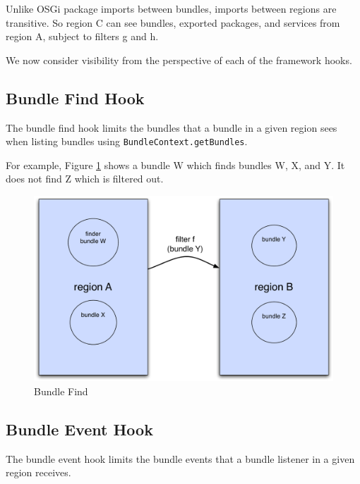 \documentclass[a4paper,9pt]{article}
\begin{document}
Unlike OSGi package imports between bundles, imports between regions are transitive.
So region C can see bundles, exported packages, and services from region A, subject to filters g and h.

We now consider visibility from the perspective of each of the framework hooks.

\subsection{Bundle Find Hook}

The bundle find hook limits the bundles that a bundle in a given region sees when listing bundles using
\texttt{BundleContext.getBundles}.

For example, Figure \ref{fig:bfind} shows a bundle W which finds bundles W, X, and Y.
It does not find Z which is filtered out. 
\begin{figure}[h!]
\begin{center}
\includegraphics*[scale=0.4]{bundle-find.pdf}
\caption{Bundle Find \label{fig:bfind}}
\end{center}
\end{figure}

\subsection{Bundle Event Hook}

The bundle event hook limits the bundle events that a bundle listener in a given region receives.
\end{document}
